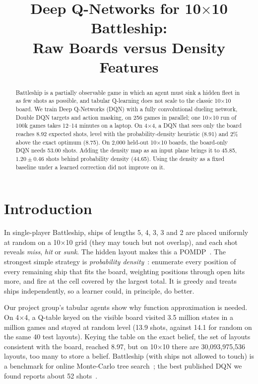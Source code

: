 \documentclass[conference,10pt]{IEEEtran}
\begin{document}
\title{Deep Q-Networks for 10$\times$10 Battleship:\\
Raw Boards versus Density Features}

\author{
}

\maketitle

\begin{abstract}
Battleship is a partially observable game in which an agent must sink a hidden
fleet in as few shots as possible, and tabular Q-learning does not scale to the
classic 10$\times$10 board. We train Deep
Q-Networks (DQN) with a fully convolutional dueling network, Double DQN targets
and action masking, on 256 games in parallel; one 10$\times$10 run of 100k games
takes 12--14 minutes on a laptop. On 4$\times$4, a DQN that sees only the board
reaches 8.92 expected shots, level with the probability-density heuristic
(8.91) and 2\% above the exact optimum (8.75). On 2{,}000 held-out
10$\times$10 boards, the board-only DQN needs 53.00 shots. Adding the density map
as an input plane brings it to 45.85, $1.20\pm0.46$ shots behind probability
density (44.65). Using the density as a fixed baseline under a learned
correction did not improve on it.
\end{abstract}

\section{Introduction}
In single-player Battleship, ships of lengths 5, 4, 3, 3 and 2 are placed
uniformly at random on a 10$\times$10 grid (they may touch but not overlap), and
each shot reveals \emph{miss}, \emph{hit} or \emph{sunk}. The hidden layout makes
this a POMDP~\cite{kaelbling1998}. The strongest simple strategy is
\emph{probability density}~\cite{berry2011}: enumerate every position of every
remaining ship that fits the board, weighting positions through open hits more,
and fire at the cell covered by the largest total. It is greedy and treats ships
independently, so a learner could, in principle, do better.

Our project group's tabular agents show why function approximation is needed.
On 4$\times$4, a Q-table keyed on the visible board visited 3.5 million states in
a million games and stayed at random level (13.9 shots, against 14.1 for random
on the same 40 test layouts). Keying the table on the exact belief, the set of
layouts consistent with the board, reached 8.97, but on 10$\times$10 there are
30{,}093{,}975{,}536 layouts, too many to store a belief. Battleship (with ships
not allowed to touch) is a benchmark for online Monte-Carlo tree
search~\cite{silver2010}; the best published DQN we found reports about 52
shots~\cite{gaintel}.
\end{document}
